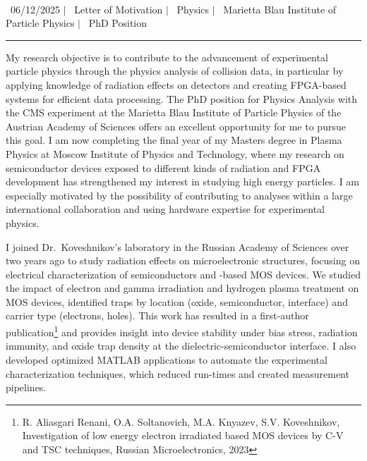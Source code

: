 \documentclass[a4paper,12pt]{article}
\begin{document}
\begin{center}
    {\Huge \scshape {\fontsize{25}{30}\selectfont{Reza}} {\fontsize{25}{30}}} \\ \vspace{3pt}
    {\small \raisebox{-0.2\height}\ {06/12/2025}} $|$
    {\small \raisebox{-0.2\height}\ {Letter of Motivation}} $|$
    {\small \raisebox{-0.2\height}\ {Physics}} $|$
    {\small \raisebox{-0.2\height}\ {Marietta Blau Institute of Particle Physics}} $|$
    {\small \raisebox{-0.2\height}\ {PhD Position}}
    \vspace{-10pt}
\end{center}
\vspace{-10pt}
\noindent\rule{\textwidth}{0.5pt}

My research objective is to contribute to the advancement of experimental particle physics through the physics analysis of collision data, in particular by applying knowledge of radiation effects on detectors and creating FPGA-based systems for efficient data processing. The PhD position for Physics Analysis with the CMS experiment at the Marietta Blau Institute of Particle Physics of the Austrian Academy of Sciences offers an excellent opportunity for me to pursue this goal. I am now completing the final year of my Masters degree in Plasma Physics at Moscow Institute of Physics and Technology, where my research on semiconductor devices exposed to different kinds of radiation and FPGA development has strengthened my interest in studying high energy particles. I am especially motivated by the possibility of contributing to analyses within a large international collaboration and using hardware expertise for experimental physics.

\vspace{10pt}
I joined Dr.\ Koveshnikov's laboratory in the Russian Academy of Sciences over two years ago to study radiation effects on microelectronic structures, focusing on electrical characterization of semiconductors and -based MOS devices. We studied the impact of electron and gamma irradiation and hydrogen plasma treatment on MOS devices, identified traps by location (oxide, semiconductor, interface) and carrier type (electrons, holes). This work has resulted in a first-author publication\footnote{R. Aliasgari Renani, O.A. Soltanovich, M.A. Knyazev, S.V. Koveshnikov, Investigation of low energy electron irradiated  based MOS devices by C-V and TSC techniques, Russian Microelectronics, 2023} and provides insight into device stability under bias stress, radiation immunity, and oxide trap density at the dielectric-semiconductor interface. I also developed optimized MATLAB applications to automate the experimental characterization techniques, which reduced run-times and created measurement pipelines. 
\end{document}
